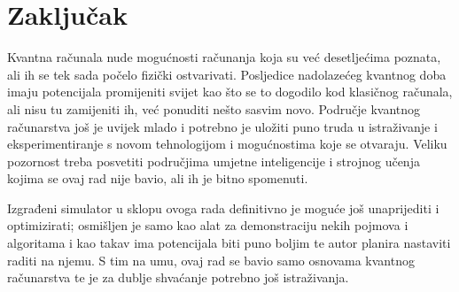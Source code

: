 \chapter{Zaključak}

Kvantna računala nude mogućnosti računanja koja su već desetljećima poznata, ali ih se tek sada počelo fizički ostvarivati. Posljedice nadolazećeg kvantnog doba imaju potencijala promijeniti svijet kao što se to dogodilo kod klasičnog računala, ali nisu tu zamijeniti ih, već ponuditi nešto sasvim novo. Područje kvantnog računarstva još je uvijek mlado i potrebno je uložiti puno truda u istraživanje i eksperimentiranje s novom tehnologijom i mogućnostima koje se otvaraju. Veliku pozornost treba posvetiti područjima umjetne inteligencije i strojnog učenja kojima se ovaj rad nije bavio, ali ih je bitno spomenuti.

Izgrađeni simulator u sklopu ovoga rada definitivno je moguće još unaprijediti i optimizirati; osmišljen je samo kao alat za demonstraciju nekih pojmova i algoritama i kao takav ima potencijala biti puno boljim te autor planira nastaviti raditi na njemu. S tim na umu, ovaj rad se bavio samo osnovama kvantnog računarstva te je za dublje shvaćanje potrebno još istraživanja.

